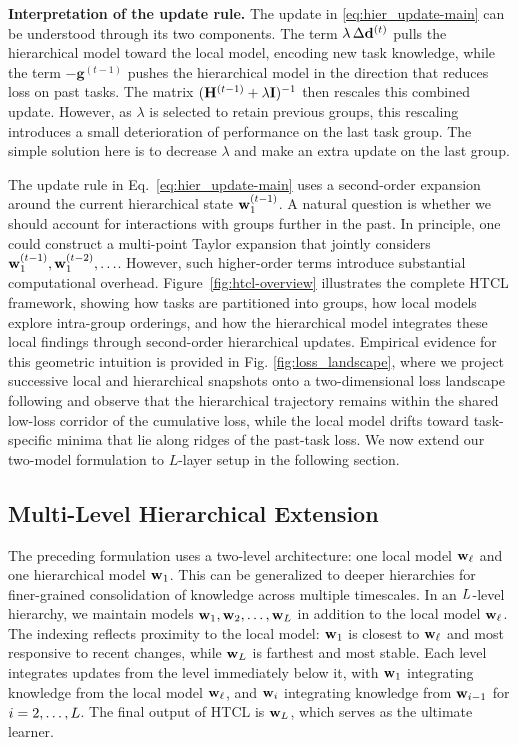 \textbf{Interpretation of the update rule.} The update in \eqref{eq:hier_update-main} can be understood through its two components. The term $\lambda \, \Delta\mathbf{d}^{(t)}$ pulls the hierarchical model toward the local model, encoding new task knowledge, while the term $-\mathbf{g}^{(t-1)}$ pushes the hierarchical model in the direction that reduces loss on past tasks. The matrix $(\mathbf{H}^{(t-1)} + \lambda \mathbf{I})^{-1}$ then rescales this combined update. However, as $\lambda$ is selected to retain previous groups, this rescaling introduces a small deterioration of performance on the last task group. The simple solution here is to decrease $\lambda$ and make an extra update on the last group.

The update rule in Eq.~\eqref{eq:hier_update-main} uses a second-order expansion around the current hierarchical state $\mathbf{w}_{1}^{(t-1)}$. A natural question is whether we should account for interactions with groups further in the past. In principle, one could construct a multi-point Taylor expansion that jointly considers $\mathbf{w}_{1}^{(t-1)}, \mathbf{w}_{1}^{(t-2)}, \ldots$. However, such higher-order terms introduce substantial computational overhead. Figure~\ref{fig:htcl-overview} illustrates the complete HTCL framework, showing how tasks are partitioned into groups, how local models explore intra-group orderings, and how the hierarchical model integrates these local findings through second-order hierarchical updates.  Empirical evidence for this geometric intuition is provided in Fig. \ref{fig:loss_landscape}, where we project successive local and hierarchical snapshots onto a two-dimensional loss landscape following \cite{li2018visualizing} and observe that the hierarchical trajectory remains within the shared low-loss corridor of the cumulative loss, while the local model drifts toward task-specific minima that lie along ridges of the past-task loss. We now extend our two-model formulation to $L$-layer setup in the following section.

\subsection{Multi-Level Hierarchical Extension}

The preceding formulation uses a two-level architecture: one local model $\mathbf{w}_{\ell}$ and one hierarchical model $\mathbf{w}_{1}$. This can be generalized to deeper hierarchies for finer-grained consolidation of knowledge across multiple timescales.  In an $L$-level hierarchy, we maintain models $\mathbf{w}_{1}, \mathbf{w}_{2}, \ldots, \mathbf{w}_{L}$ in addition to the local model $\mathbf{w}_{\ell}$. The indexing reflects proximity to the local model: $\mathbf{w}_{1}$ is closest to $\mathbf{w}_{\ell}$ and most responsive to recent changes, while $\mathbf{w}_{L}$ is farthest and most stable. Each level integrates updates from the level immediately below it, with $\mathbf{w}_{1}$ integrating knowledge from the local model $\mathbf{w}_{\ell}$, and $\mathbf{w}_{i}$ integrating knowledge from $\mathbf{w}_{i-1}$ for $i = 2, \ldots, L$. The final output of HTCL is $\mathbf{w}_{L}$, which serves as the ultimate learner.


